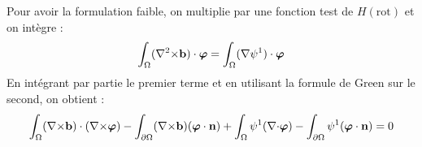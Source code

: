 Pour avoir la formulation faible, on multiplie par une fonction test de $H(\mathrm{rot})$ et on intègre :
\[ \int_\Omega ({\nabla^2\times} \mathbf{b})\cdot\bm{\varphi} = \int_\Omega ({\nabla}\psi^1)\cdot\bm{\varphi} \]
En intégrant par partie le premier terme et en utilisant la formule de Green sur le second, on obtient :
\begin{equation} \label{fvbcurl}
\int_\Omega ({\nabla\times} \mathbf{b})\cdot({\nabla\times}\bm{\varphi}) - \int_{\partial\Omega} ({\nabla\times} \mathbf{b})(\bm{\varphi}\cdot \mathbf{n}) + \int_\Omega \psi^1({\nabla\cdot}\bm{\varphi}) - \int_{\partial\Omega} \psi^1(\bm{\varphi}\cdot \mathbf{n}) = 0
\end{equation}



